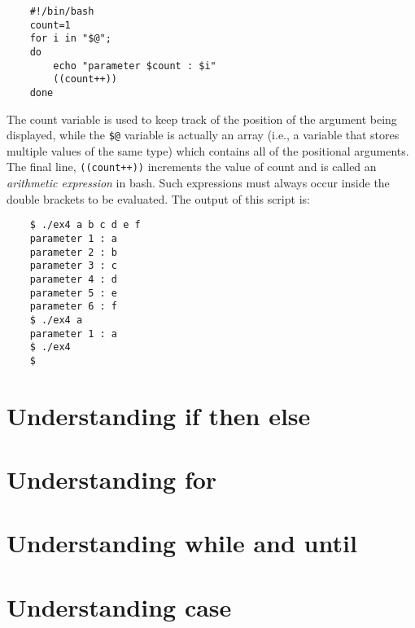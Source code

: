 	\vspace{-15pt}
	\begin{verbatim}
	#!/bin/bash
	count=1
	for i in "$@";
	do
		echo "parameter $count : $i"
		((count++))
	done
	\end{verbatim}
	\vspace{-10pt}	
	
	\noindent
	The count variable is used to keep track of the position of the argument being displayed, while the \verb|$@| variable is actually an array (i.e., a variable that stores multiple values of the same type) which contains all of the positional arguments. The final line, \verb|((count++))| increments the value of count and is called an \textit{arithmetic expression} in bash. Such expressions must always occur inside the double brackets to be evaluated. The output of this script is:
	
	\vspace{-15pt}
	\begin{verbatim}
	$ ./ex4 a b c d e f
	parameter 1 : a
	parameter 2 : b
	parameter 3 : c
	parameter 4 : d
	parameter 5 : e
	parameter 6 : f
	$ ./ex4 a 
	parameter 1 : a
	$ ./ex4
	$
	\end{verbatim}
	\vspace{-10pt}	
	
	\noindent
	
	
	\section{Understanding if then else}
	\section{Understanding for}
	\section{Understanding while and until}
	\section{Understanding case}
		

